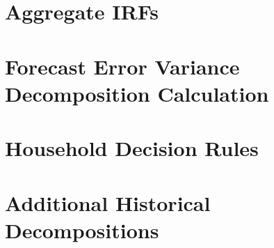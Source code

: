 \documentclass[11pt]{article}
\numberwithin{equation}{section} %
\numberwithin{figure}{section} %
\numberwithin{table}{section} %
\begin{document}
\section{Aggregate IRFs} \label{app:agg-irfs}

\FloatBarrier

\section{Forecast Error Variance Decomposition Calculation} \label{app:fevd}

\FloatBarrier

\section{Household Decision Rules} \label{app:dec-rules}

\FloatBarrier

\section{Additional Historical Decompositions} \label{app:hist-decomp}

\FloatBarrier
\end{document}
